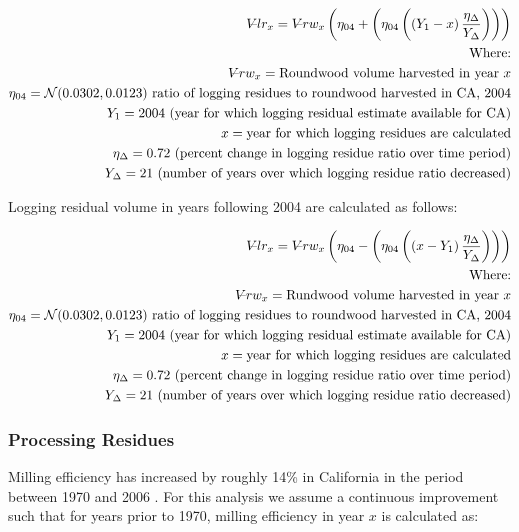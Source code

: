 \documentclass[a4paper]{article}
\begin{document}
\begin{align*}
V\llap{--}lr_{x} = V\llap{--}rw_{x}\left(\eta_{04}+ \left(\eta_{04}\left(\left(Y_1-x\right)\frac{\eta_\Delta}{Y_\Delta}\right)\right)\right)\\
\text{Where:}\\
V\llap{--}rw_{x} = \text{Roundwood volume harvested in year }x\\
\eta_{04} = \mathcal{N}(0.0302,0.0123) \text{ ratio of logging residues to roundwood harvested in CA, 2004}\\
Y_1 = 2004 \text{ (year for which logging residual estimate available for CA)} \\
x = \text{year for which logging residues are calculated}\\
\eta_\Delta = 0.72 \text{ (percent change in logging residue ratio over time period)}\\
Y_\Delta = 21\text{ (number of years over which logging residue ratio decreased)}
\end{align*}

Logging residual volume in years following 2004 are calculated as follows:

\begin{align*}
V\llap{--}lr_{x} = V\llap{--}rw_{x}\left(\eta_{04}- \left(\eta_{04}\left(\left(x-Y_1\right)\frac{\eta_\Delta}{Y_\Delta}\right)\right)\right)\\
\text{Where:}\\
V\llap{--}rw_{x} = \text{Rundwood volume harvested in year }x\\
\eta_{04} = \mathcal{N}(0.0302,0.0123) \text{ ratio of logging residues to roundwood harvested in CA, 2004}\\
Y_1 = 2004 \text{ (year for which logging residual estimate available for CA)} \\
x = \text{year for which logging residues are calculated}\\
\eta_\Delta = 0.72 \text{ (percent change in logging residue ratio over time period)}\\
Y_\Delta = 21\text{ (number of years over which logging residue ratio decreased)}
\end{align*}

\subsubsection{Processing Residues}
\label{sec:orgheadline11}
Milling efficiency has increased by roughly 14\% in California in the period between 1970 and 2006 \citet{Keegan2010}. For this analysis we assume a continuous improvement such that for years prior to 1970, milling efficiency in year \(x\) is calculated as:
\end{document}
